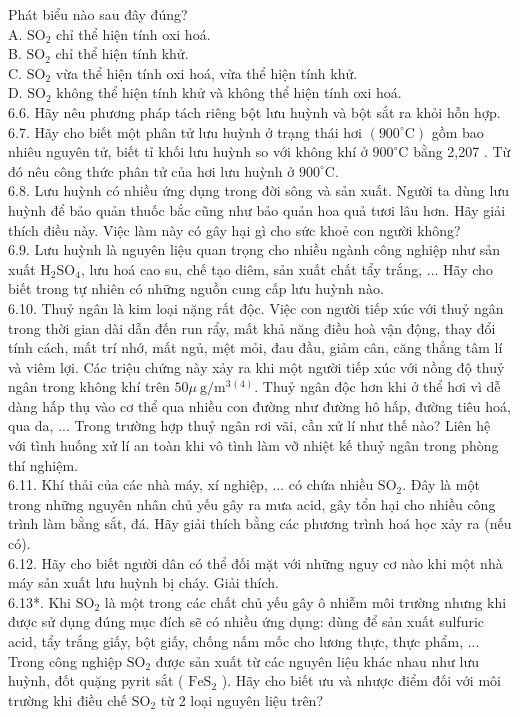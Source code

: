 \documentclass[10pt]{article}
\begin{document}
Phát biểu nào sau đây đúng?\\
A. $\mathrm{SO}_{2}$ chỉ thể hiện tính oxi hoá.\\
B. $\mathrm{SO}_{2}$ chỉ thể hiện tính khử.\\
C. $\mathrm{SO}_{2}$ vừa thể hiện tính oxi hoá, vừa thể hiện tính khử.\\
D. $\mathrm{SO}_{2}$ không thể hiện tính khử và không thể hiện tính oxi hoá.\\
6.6. Hãy nêu phương pháp tách riêng bột lưu huỳnh và bột sắt ra khỏi hỗn hợp.\\
6.7. Hãy cho biết một phân tử lưu huỳnh ở trạng thái hơi $\left(900^{\circ} \mathrm{C}\right)$ gồm bao nhiêu nguyên tử, biết tỉ khối lưu huỳnh so với không khí ở $900^{\circ} \mathrm{C}$ bằng 2,207 . Từ đó nêu công thức phân tử của hơi lưu huỳnh ở $900^{\circ} \mathrm{C}$.\\
6.8. Lưu huỳnh có nhiều ứng dụng trong đời sông và sản xuất. Người ta dùng lưu huỳnh để bảo quản thuốc bắc cũng như bảo quản hoa quả tươi lâu hơn. Hãy giải thích điều này. Việc làm này có gây hại gì cho sức khoẻ con người không?\\
6.9. Lưu huỳnh là nguyên liệu quan trọng cho nhiều ngành công nghiệp như sản xuất $\mathrm{H}_{2} \mathrm{SO}_{4}$, lưu hoá cao su, chế tạo diêm, sản xuất chất tẩy trắng, ... Hãy cho biết trong tự nhiên có những nguồn cung cấp lưu huỳnh nào.\\
6.10. Thuỷ ngân là kim loại nặng rất độc. Việc con người tiếp xúc với thuỷ ngân trong thời gian dài dẫn đến run rẩy, mất khả năng điều hoà vận động, thay đổi tính cách, mất trí nhớ, mất ngủ, mệt mỏi, đau đầu, giảm cân, căng thẳng tâm lí và viêm lợi. Các triệu chứng này xảy ra khi một người tiếp xúc với nồng độ thuỷ ngân trong không khí trên $50 \mu \mathrm{~g} / \mathrm{m}^{3}{ }^{(4)}$. Thuỷ ngân độc hơn khi ở thể hơi vì dễ dàng hấp thụ vào cơ thể qua nhiều con đường như đường hô hấp, đường tiêu hoá, qua da, ... Trong trường hợp thuỷ ngân rơi vãi, cần xử lí như thế nào? Liên hệ với tình huống xử lí an toàn khi vô tình làm vỡ nhiệt kế thuỷ ngân trong phòng thí nghiệm.\\
6.11. Khí thải của các nhà máy, xí nghiệp, ... có chứa nhiều $\mathrm{SO}_{2}$. Đây là một trong những nguyên nhân chủ yếu gây ra mưa acid, gây tổn hại cho nhiều công trình làm bằng sắt, đá. Hãy giải thích bằng các phương trình hoá học xảy ra (nếu có).\\
6.12. Hãy cho biết người dân có thể đối mặt với những nguy cơ nào khi một nhà máy sản xuất lưu huỳnh bị cháy. Giải thích.\\
6.13*. Khi $\mathrm{SO}_{2}$ là một trong các chất chủ yếu gây ô nhiễm môi trường nhưng khi được sử dụng đúng mục đích sẽ có nhiều ứng dụng: dùng để sản xuất sulfuric acid, tẩy trắng giấy, bột giấy, chống nấm mốc cho lương thực, thực phẩm, ... Trong công nghiệp $\mathrm{SO}_{2}$ được sản xuất từ các nguyên liệu khác nhau như lưu huỳnh, đốt quặng pyrit sắt ( $\mathrm{FeS}_{2}$ ). Hãy cho biết ưu và nhược điểm đối với môi trường khi điều chế $\mathrm{SO}_{2}$ từ 2 loại nguyên liệu trên?
\end{document}
